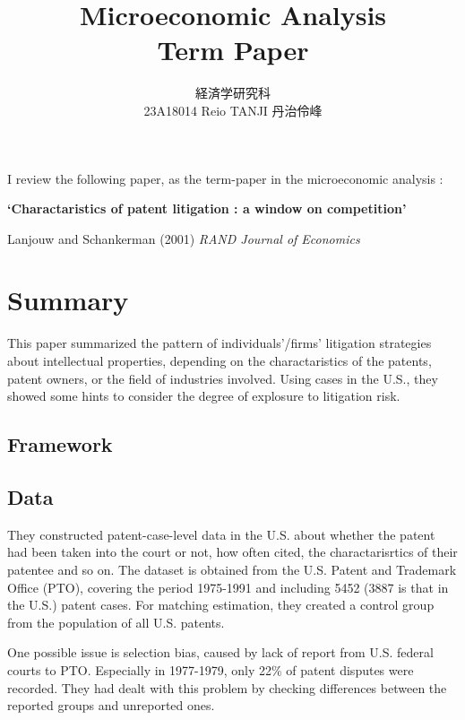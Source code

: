 \documentclass{jsarticle}[12pt]
\begin{document}
\title{Microeconomic Analysis \\
Term Paper}
\author{経済学研究科　 \\ 23A18014 Reio TANJI 丹治伶峰}
\date{}
\maketitle

\large

I review the following paper, as the term-paper in the microeconomic analysis :

\vspace{1zw}

\textbf{`Charactaristics of patent litigation : a window on competition'}

Lanjouw and Schankerman (2001) \textit{RAND Journal of Economics}

 \section{Summary}
 
 This paper summarized the pattern of individuals'/firms' litigation strategies about intellectual properties, depending on the charactaristics of the patents, patent owners, or the field of industries involved. Using cases in the U.S., they showed some hints to consider the degree of explosure to litigation risk.
 
  \subsection{Framework}
  
  
  
  \subsection{Data}
  
  They constructed patent-case-level data in the U.S. about whether the patent had been taken into the court or not, how often cited, the charactarisrtics of their patentee and so on. The dataset is obtained from the U.S. Patent and Trademark Office (PTO), covering the period 1975-1991 and including 5452 (3887 is that in the U.S.) patent cases. For matching estimation, they created a control group from the population of all U.S. patents.
  
  One possible issue is selection bias, caused by lack of report from U.S. federal courts to PTO. Especially in 1977-1979, only 22\% of patent disputes were recorded. They had dealt with this problem by checking differences between the reported groups and unreported ones.
  
\end{document}
